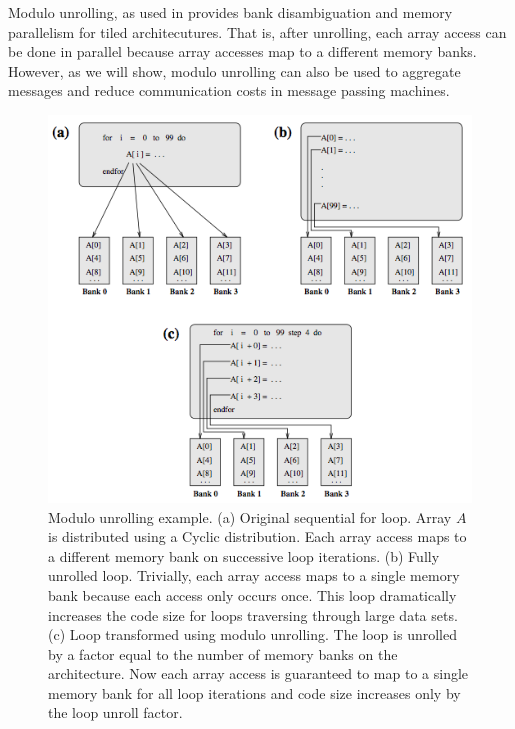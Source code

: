 Modulo unrolling, as used in \cite{barua1999maps} provides bank disambiguation and memory parallelism for tiled architecutures. That is, after unrolling, each array access can be done in parallel because array accesses map to a different memory banks. However, as we will show, modulo unrolling can also be used to aggregate messages and reduce communication costs in message passing machines. 

\begin{figure}
	\begin{center}
	\includegraphics[scale=0.40]{./Figures/modulo_unrolling}
	\caption{Modulo unrolling example. (a) Original sequential for loop. Array $A$ is distributed using a Cyclic distribution. Each array access maps to a different memory bank on successive loop iterations. (b) Fully unrolled loop. Trivially, each array access maps to a single memory bank because each access only occurs once. This loop dramatically increases the code size for loops traversing through large data sets. (c) Loop transformed using modulo unrolling. The loop is unrolled by a factor equal to the number of memory banks on the architecture. Now each array access is guaranteed to map to a single memory bank for all loop iterations and code size increases only by the loop unroll factor.}
	\label{modulo_unrolling}
	\end{center}
\end{figure}
